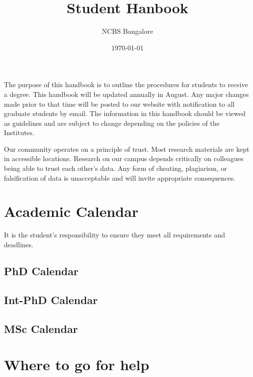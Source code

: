 \documentclass[a4paper]{extarticle}
\author{NCBS Bangalore}
\title{Student Hanbook}
\date{\today}
\begin{document}


The purpose of this handbook is to outline the procedures for students to receive a degree.
This handbook will be updated annually in August. Any major changes made prior to that
time will be posted to our website with notification to all graduate students by email. The
information in this handbook should be viewed as guidelines and are subject to change
depending on the policies of the Institutes.

\vspace{10cm}

\begin{mdframed}[frametitle=\textsc{Honor Code},backgroundcolor=yellow!20]
Our community operates on a principle of trust. Most research materials are kept
in accessible locations. Research on our campus depends critically on colleagues
being able to trust each other’s data.  Any form of cheating, plagiarism, or
falsification of data is unacceptable and will invite appropriate consequences.
\end{mdframed}

\newpage
\tableofcontents 

\newpage
\section{Academic Calendar}
\label{sec:academic_calendar}

It is the student’s responsibility to ensure they meet all requirements and
deadlines. 



\subsection{PhD Calendar}


\subsection{Int-PhD Calendar}


\subsection{MSc Calendar}


\newpage
\section{Where to go for help}
\end{document}
